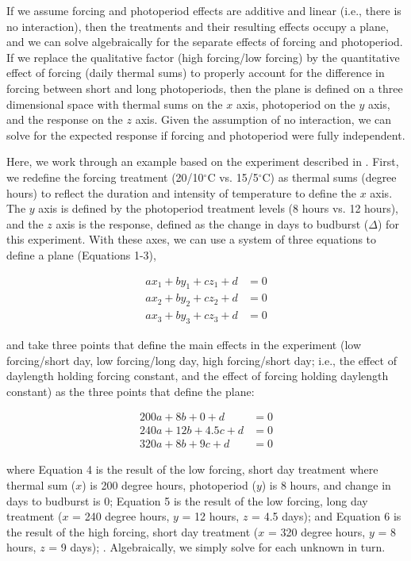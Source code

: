 \documentclass[11pt]{article}
\begin{document}
If we assume forcing and photoperiod effects are additive and linear (i.e., there is no interaction), then the treatments and their resulting effects occupy a plane, and we can solve algebraically for the separate effects of forcing and photoperiod.  If we replace the qualitative factor (high forcing/low forcing) by the quantitative effect of forcing (daily thermal sums) to properly account for the difference in forcing between short and long photoperiods, then the plane is defined on a three dimensional space with thermal sums on the $x$ axis, photoperiod on the $y$ axis, and the response on the $z$ axis. Given the assumption of no interaction, we can solve for the expected response if forcing and photoperiod were fully independent. 

Here, we work through an example based on the experiment described in \cite{Flynn2018}. First, we redefine the forcing treatment (20/10$^{\circ}$C vs. 15/5$^{\circ}$C) as thermal sums (degree hours) to reflect the duration and intensity of temperature to define the $x$ axis. The $y$ axis is defined by the photoperiod treatment levels (8 hours vs. 12 hours), and the $z$ axis is the response, defined as the change in days to budburst ($\Delta$) for this experiment. With these axes, we can use a system of three equations to define a plane (Equations 1-3), 

\begin{align}
ax_1+by_1+cz_1+d & =0\\
ax_2+by_2+cz_2+d & =0\\
ax_3+by_3+cz_3+d & =0
\end{align}

and take three points that define the main effects in the experiment (low forcing/short day, low forcing/long day, high forcing/short day; i.e., the effect of daylength holding forcing constant, and the effect of forcing holding daylength constant) as the three points that define the plane:

\begin{align}
200a + 8b + 0 + d &= 0\\
240a + 12b+4.5c + d &=0\\
320a + 8b + 9c+ d &=0
\end{align}

where Equation 4 is the result of the low forcing, short day treatment where thermal sum ($x$) is 200 degree hours, photoperiod ($y$) is 8 hours, and change in days to budburst is 0; Equation 5 is the result of the low forcing, long day treatment ($x$ = 240 degree hours, $y$ = 12 hours, $z$ = 4.5 days); and Equation 6 is the result of the high forcing, short day treatment ($x$ = 320 degree hours, $y$ = 8 hours, $z$ = 9 days); \citep[see][Table S5]{Flynn2018}.  Algebraically, we simply solve for each unknown in turn. 
\end{document}
